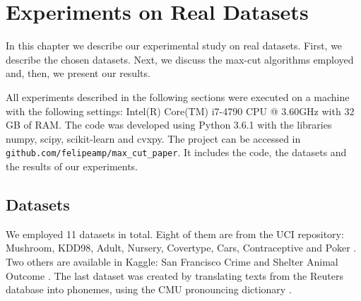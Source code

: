 \newpage

\chapter{Experiments on Real Datasets}
\label{chap:experimentsdatasets}


In this chapter we describe our
experimental study on real datasets.
First, we describe the chosen datasets.
Next, we discuss the max-cut algorithms 
employed and, then, we
present our results.

All  experiments described in the following sections were executed on a machine with the following settings: Intel(R) Core(TM) i7-4790 CPU @ 3.60GHz
with 32 GB of RAM. The code was
developed using Python 3.6.1 
with the libraries numpy, scipy, scikit-learn and cvxpy.
The project can be accessed in 
{\tt github.com/felipeamp/max\_cut\_paper}.
It includes  the code, the datasets and the results of our experiments.


\section{Datasets}
We employed 11 datasets in total. Eight of them are from the UCI repository:
Mushroom, KDD98, Adult, Nursery, Covertype, Cars, Contraceptive and Poker  \cite{Lichman:2013}.
Two others are available in Kaggle: San Francisco Crime and Shelter Animal Outcome
\cite{SFC,AnimalShelter}.
The last dataset was created by translating texts from the Reuters database \cite{Lichman:2013} into phonemes, using the CMU pronouncing dictionary \cite{CMU-PD}.

